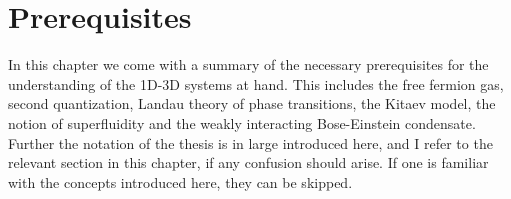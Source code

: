
\chapter{Prerequisites} %

\label{Chapter2} %


In this chapter we come with a summary of the necessary prerequisites for the understanding of the 1D-3D systems at hand. This includes the free fermion gas, second quantization, Landau theory of phase transitions, the Kitaev model, the notion of superfluidity and the weakly interacting Bose-Einstein condensate. Further the notation of the thesis is in large introduced here, and I refer to the relevant section in this chapter, if any confusion should arise. If one is familiar with the concepts introduced here, they can be skipped. 

